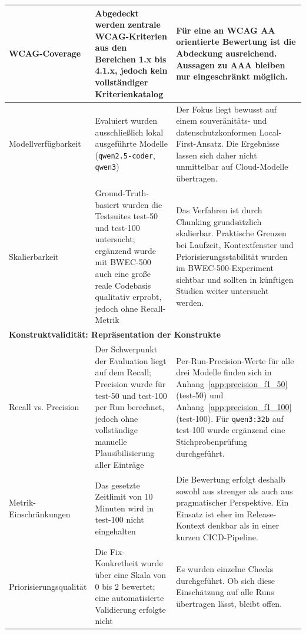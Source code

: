 \begin{longtable}{|p{2.9cm}|p{5.6cm}|p{5.9cm}|}
\hline
\ac{WCAG}-Coverage & Abgedeckt werden zentrale \ac{WCAG}-Kriterien aus den Bereichen 1.x bis 4.1.x, jedoch kein vollständiger Kriterienkatalog & Für eine an \ac{WCAG} AA orientierte Bewertung ist die Abdeckung ausreichend. Aussagen zu AAA bleiben nur eingeschränkt möglich. \\
\hline
Modell\-verfügbarkeit & Evaluiert wurden ausschließlich lokal ausgeführte Modelle (\texttt{qwen2.5-coder}, \texttt{qwen3}) & Der Fokus liegt bewusst auf einem souveränitäts- und datenschutzkonformen Local-First-Ansatz. Die Ergebnisse lassen sich daher nicht unmittelbar auf Cloud-Modelle übertragen. \\
\hline
Skalierbarkeit & Ground-Truth-basiert wurden die Testsuites test-50 und test-100 untersucht; ergänzend wurde mit \ac{BWEC}-500 auch eine große reale Codebasis qualitativ erprobt, jedoch ohne Recall-Metrik & Das Verfahren ist durch Chunking grundsätzlich skalierbar. Praktische Grenzen bei Laufzeit, Kontextfenster und Priorisierungsstabilität wurden im \ac{BWEC}-500-Experiment sichtbar und sollten in künftigen Studien weiter untersucht werden. \\
\hline
\multicolumn{3}{|l|}{\textbf{Konstruktvalidität: Repräsentation der Konstrukte}} \\
\hline
Recall vs. Precision & Der Schwerpunkt der Evaluation liegt auf dem Recall; Precision wurde für test-50 und test-100 per Run berechnet, jedoch ohne vollständige manuelle Plausibilisierung aller Einträge & Per-Run-Precision-Werte für alle drei Modelle finden sich in Anhang~\ref{app:precision_f1_50} (test-50) und Anhang~\ref{app:precision_f1_100} (test-100). Für \texttt{qwen3:32b} auf test-100 wurde ergänzend eine Stichprobenprüfung durchgeführt. \\
\hline
Metrik-Einschränkungen & Das gesetzte Zeitlimit von 10 Minuten wird in test-100 nicht eingehalten & Die Bewertung erfolgt deshalb sowohl aus strenger als auch aus pragmatischer Perspektive. Ein Einsatz ist eher im Release-Kontext denkbar als in einer kurzen \ac{CICD}-Pipeline. \\
\hline
Priorisierungs\-qualität & Die Fix-Konkretheit wurde über eine Skala von 0 bis 2 bewertet; eine automatisierte Validierung erfolgte nicht & Es wurden einzelne Checks durchgeführt. Ob sich diese Einschätzung auf alle Runs übertragen lässt, bleibt offen.\footnotemark\\
\hline
\end{longtable}

